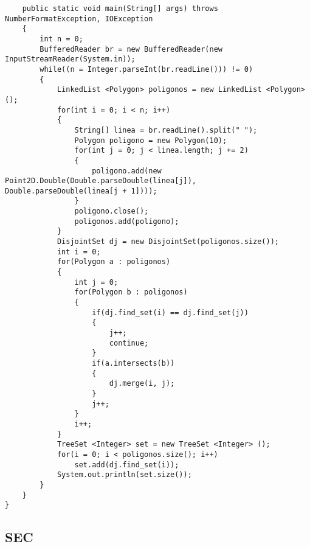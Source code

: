 \documentclass[a4paper, 11pt, oneside]{report}
\begin{document}
\begin{verbatim}
	public static void main(String[] args) throws NumberFormatException, IOException
	{
		int n = 0;
		BufferedReader br = new BufferedReader(new InputStreamReader(System.in));
		while((n = Integer.parseInt(br.readLine())) != 0)
		{
			LinkedList <Polygon> poligonos = new LinkedList <Polygon> ();
			for(int i = 0; i < n; i++)
			{
				String[] linea = br.readLine().split(" ");
				Polygon poligono = new Polygon(10);
				for(int j = 0; j < linea.length; j += 2)
				{
					poligono.add(new Point2D.Double(Double.parseDouble(linea[j]), Double.parseDouble(linea[j + 1])));
				}
				poligono.close();
				poligonos.add(poligono);
			}
			DisjointSet dj = new DisjointSet(poligonos.size());
			int i = 0;
			for(Polygon a : poligonos)
			{
				int j = 0;
				for(Polygon b : poligonos)
				{
					if(dj.find_set(i) == dj.find_set(j))
					{
						j++;
						continue;
					}
					if(a.intersects(b))
					{
						dj.merge(i, j);
					}
					j++;
				}
				i++;
			}
			TreeSet <Integer> set = new TreeSet <Integer> ();
			for(i = 0; i < poligonos.size(); i++)
				set.add(dj.find_set(i));
			System.out.println(set.size());
		}
	}
}

\end{verbatim}

\subsection{SEC}
\end{document}
